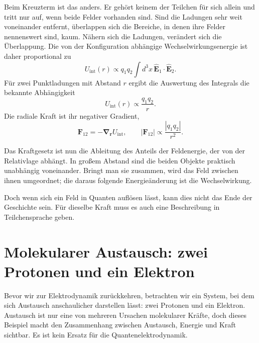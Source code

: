 Beim Kreuzterm ist das anders. Er gehört keinem der Teilchen für sich allein und tritt nur auf, wenn beide Felder vorhanden sind. Sind die Ladungen sehr weit voneinander entfernt, überlappen sich die Bereiche, in denen ihre Felder nennenswert sind, kaum. Nähern sich die Ladungen, verändert sich die Überlappung. Die von der Konfiguration abhängige Wechselwirkungsenergie ist daher proportional zu
\begin{equation}
U_{\text{int}}(r)\propto q_1q_2\int d^3x\,
\widehat{\mathbf E}_1\!\cdot\!\widehat{\mathbf E}_2.
\end{equation}
Für zwei Punktladungen mit Abstand \(r\) ergibt die Auswertung des Integrals die bekannte Abhängigkeit
\begin{equation}
U_{\text{int}}(r)\propto\frac{q_1q_2}{r}.
\end{equation}
Die radiale Kraft ist ihr negativer Gradient,
\begin{equation}
\mathbf F_{12}=-\boldsymbol\nabla_{\mathbf r}U_{\text{int}},
\qquad
|\mathbf F_{12}|\propto\frac{|q_1q_2|}{r^2}.
\end{equation}

Das Kraftgesetz ist nun die Ableitung des Anteils der Feldenergie, der von der Relativlage abhängt. In großem Abstand sind die beiden Objekte praktisch unabhängig voneinander. Bringt man sie zusammen, wird das Feld zwischen ihnen umgeordnet; die daraus folgende Energieänderung ist die Wechselwirkung.

Doch wenn sich ein Feld in Quanten auflösen lässt, kann dies nicht das Ende der Geschichte sein. Für dieselbe Kraft muss es auch eine Beschreibung in Teilchensprache geben.

\section{Molekularer Austausch: zwei Protonen und ein Elektron}

Bevor wir zur Elektrodynamik zurückkehren, betrachten wir ein System, bei dem sich Austausch anschaulicher darstellen lässt: zwei Protonen und ein Elektron. Austausch ist nur eine von mehreren Ursachen molekularer Kräfte, doch dieses Beispiel macht den Zusammenhang zwischen Austausch, Energie und Kraft sichtbar. Es ist kein Ersatz für die Quantenelektrodynamik.

